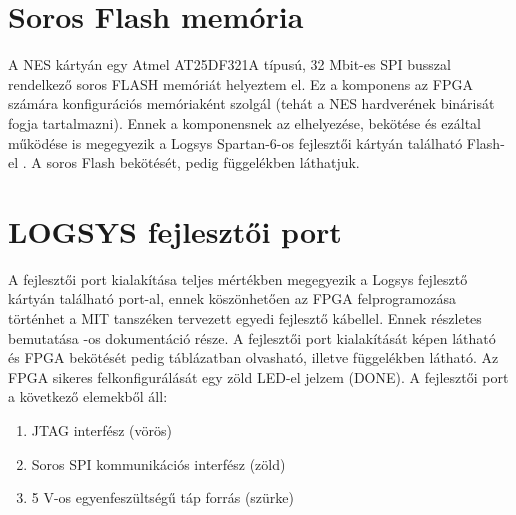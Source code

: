 \section{Soros Flash memória}
	
	A NES kártyán egy Atmel AT25DF321A típusú, 32 Mbit-es SPI busszal rendelkező soros FLASH memóriát helyeztem el. Ez a komponens az FPGA számára konfigurációs memóriaként szolgál (tehát a NES hardverének binárisát fogja tartalmazni). Ennek a komponensnek az elhelyezése, bekötése és ezáltal működése is megegyezik a Logsys Spartan-6-os fejlesztői kártyán található Flash-el \cite{spatan6}. A soros Flash bekötését, pedig  függelékben láthatjuk.
	
\section{LOGSYS fejlesztői port}
	
	A fejlesztői port kialakítása teljes mértékben megegyezik a Logsys fejlesztő kártyán található port-al, ennek köszönhetően az FPGA felprogramozása történhet a MIT tanszéken tervezett egyedi fejlesztő kábellel. Ennek részletes bemutatása -os dokumentáció része. A fejlesztői port kialakítását  képen látható és FPGA bekötését pedig  táblázatban olvasható, illetve  függelékben látható. Az FPGA sikeres felkonfigurálását egy zöld LED-el jelzem (DONE). A fejlesztői port a következő elemekből áll:  
	
	\begin{enumerate}
		\item JTAG interfész (vörös)
		\item Soros SPI kommunikációs interfész (zöld)
		\item 5 V-os egyenfeszültségű táp forrás (szürke)
	\end{enumerate}
	
